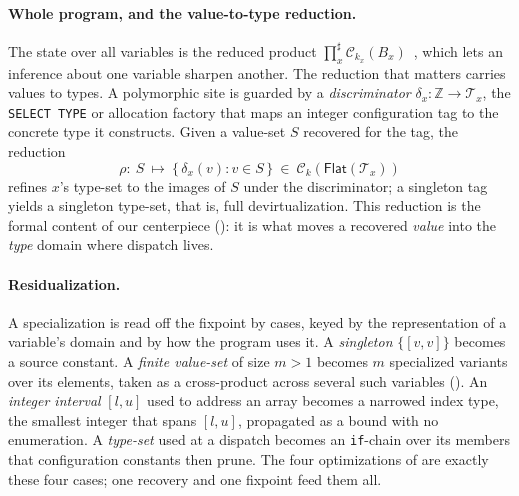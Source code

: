\paragraph{Whole program, and the value-to-type reduction.}
The state over all variables is the reduced product $\prod^\sharp_x \mathcal{C}_{k_x}(B_x)$~\cite{reducedproduct}, which lets an inference about one variable sharpen another. The reduction that matters carries values to types. A polymorphic site is guarded by a \emph{discriminator} $\delta_x:\mathbb{Z}\to\mathcal{T}_x$, the \lstinline[style=fortran]|SELECT TYPE| or allocation factory that maps an integer configuration tag to the concrete type it constructs. Given a value-set $S$ recovered for the tag, the reduction
\[
  \rho:\ S\ \longmapsto\ \{\,\delta_x(v) : v\in S\,\}\ \in\ \mathcal{C}_{k}\!\left(\mathsf{Flat}(\mathcal{T}_x)\right)
\]
refines $x$'s type-set to the images of $S$ under the discriminator; a singleton tag yields a singleton type-set, that is, full devirtualization. This reduction is the formal content of our centerpiece (): it is what moves a recovered \emph{value} into the \emph{type} domain where dispatch lives.

\paragraph{Residualization.}
A specialization is read off the fixpoint by cases, keyed by the representation of a variable's domain and by how the program uses it. A \emph{singleton} $\{[v,v]\}$ becomes a source constant. A \emph{finite value-set} of size $m>1$ becomes $m$ specialized variants over its elements, taken as a cross-product across several such variables (). An \emph{integer interval} $[l,u]$ used to address an array becomes a narrowed index type, the smallest integer that spans $[l,u]$, propagated as a bound with no enumeration. A \emph{type-set} used at a dispatch becomes an \lstinline[style=fortran]|if|-chain over its members that configuration constants then prune. The four optimizations of  are exactly these four cases; one recovery and one fixpoint feed them all.

